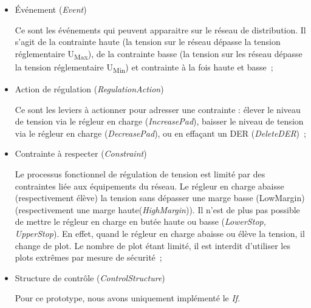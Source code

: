 		\begin{itemize}
		
\item Événement (\textit{Event})

Ce sont les événements qui peuvent apparaitre sur le réseau de distribution. Il s'agit de la contrainte haute (la tension sur le réseau dépasse la tension réglementaire U\textsubscript{Max}), de la contrainte basse (la tension sur les réseau dépasse la tension réglementaire U\textsubscript{Min}) et contrainte à la fois haute et basse~;

\item Action de régulation (\textit{RegulationAction})

Ce sont les leviers à actionner pour adresser une contrainte : élever le niveau de tension via le régleur en charge (\textit{IncreasePad}), baisser le niveau de tension via le régleur en charge (\textit{DecreasePad}), ou en effaçant un DER (\textit{DeleteDER})~;

\item Contrainte à respecter (\textit{Constraint})

Le processus fonctionnel de régulation de tension est limité par des contraintes liée aux équipements du réseau. Le régleur en charge abaisse (respectivement élève) la tension sans dépasser une marge basse (LowMargin) (respectivement une marge haute(\textit{HighMargin})). Il n'est de plus pas possible de mettre le régleur en charge en butée haute ou basse (\textit{LowerStop, UpperStop}). En effet, quand le régleur en charge abaisse ou élève la tension, il change de plot. Le nombre de plot étant limité, il est interdit d'utiliser les plots extrêmes par mesure de sécurité~;

\item Structure de contrôle (\textit{ControlStructure})

Pour ce prototype, nous avons uniquement implémenté le \textit{If}. 

		\end{itemize}
		
